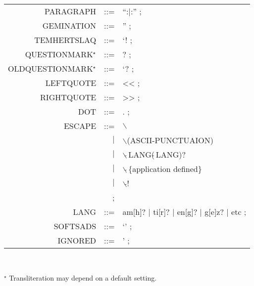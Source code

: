 {\begin{tabular}{|rrl|}
PARAGRAPH   & ::= & {\textrm{``}}:$|$:{\textrm{''}} ; \\
GEMINATION  & ::= & '' ; \\
TEMHERTSLAQ & ::= & `! ; \\
QUESTIONMARK$^\star$      & ::= & ? ; \\
OLDQUESTIONMARK$^\star$   & ::= & `? ; \\
LEFTQUOTE   & ::= & << ; \\
RIGHTQUOTE  & ::= & >> ; \\
DOT         & ::= & . ; \\ \hline
ESCAPE      & ::= & $\backslash$ \\
            & $|$ & $\backslash$(ASCII-PUNCTUAION) \\
            & $|$ & $\backslash\tilde{}$\,LANG($\tilde{}$\,LANG)? \\ 
            & $|$ & $\backslash\tilde{}$\,\{application defined\} \\ 
            & $|$ & $\backslash\tilde{}$! \\ 
            &  ;  &          \\
LANG        & ::= & am[h]? $|$ ti[r]? $|$ en[g]? $|$ g[e]z? $|$ etc ; \\ \hline
SOFTSADS    & ::= & `' ; \\
IGNORED     & ::= & ' ; \\ \hline\hline
\end{tabular}}  \\
\noi

$^\star$ Transliteration may depend on a default setting.

